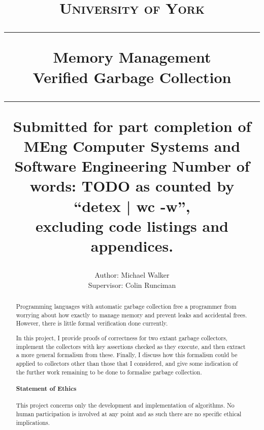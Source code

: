 \documentclass[10pt,a4paper,twoside,openright]{report}
\title{%
{\normalsize\scshape University of York}\\
\vspace{2em}
\hrule
\vspace{1em}
{\huge\bfseries Memory Management}\\
\vspace{1em}
{\bfseries Verified Garbage Collection}\\
\vspace{1em}
\hrule
\vspace{1em}
{\small Submitted for part completion of MEng Computer Systems and Software Engineering}
\vfill%
{\normalsize Number of words: TODO as counted by ``detex | wc -w'',\\
excluding code listings and appendices.}
}
\author{%
Author: Michael Walker\\
Supervisor: Colin Runciman
}
\date{}
\theoremstyle{example}
\begin{document}

\pagestyle{empty}

\maketitle

\cleardoublepage
\begin{abstract}
Programming languages with automatic garbage collection free a
programmer from worrying about how exactly to manage memory and
prevent leaks and accidental frees. However, there is little formal
verification done currently.

In this project, I provide proofs of correctness for two extant
garbage collectors, implement the collectors with key assertions
checked as they execute, and then extract a more general formalism
from these. Finally, I discuss how this formalism could be applied to
collectors other than those that I considered, and give some
indication of the further work remaining to be done to formalise
garbage collection.

\vfill

\paragraph{Statement of Ethics}

This project concerns only the development and implementation of
algorithms. No human participation is involved at any point and as
such there are no specific ethical implications.
\end{abstract}


\cleardoublepage
\pagestyle{plain}
\setcounter{page}{1}
\tableofcontents

\lstlistoflistings

\newpage
\cleardoublepage
{}











\begin{appendices}
  \glsaddall
  \printglossaries

  
  

  
\end{appendices}
\end{document}

